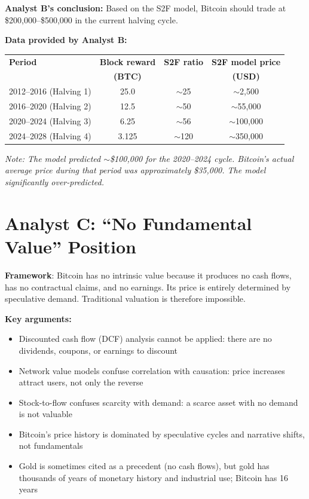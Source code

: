 \documentclass[11pt]{article}
\begin{document}
\medskip
\noindent\textbf{Analyst B's conclusion:} Based on the S2F model, Bitcoin should trade at \$200,000--\$500,000 in the current halving cycle.

\medskip
\noindent\textbf{Data provided by Analyst B:}

\begin{center}
\small
\begin{tabular}{lccc}
\toprule
\textbf{Period} & \textbf{Block reward} & \textbf{S2F ratio} & \textbf{S2F model price} \\
 & \textbf{(BTC)} & & \textbf{(USD)} \\
\midrule
2012--2016 (Halving 1) & 25.0 & $\sim$25 & $\sim$2,500 \\
2016--2020 (Halving 2) & 12.5 & $\sim$50 & $\sim$55,000 \\
2020--2024 (Halving 3) & 6.25 & $\sim$56 & $\sim$100,000 \\
2024--2028 (Halving 4) & 3.125 & $\sim$120 & $\sim$350,000 \\
\bottomrule
\end{tabular}
\end{center}

\smallskip
\noindent\textit{Note: The model predicted $\sim$\$100,000 for the 2020--2024 cycle. Bitcoin's actual average price during that period was approximately \$35,000. The model significantly over-predicted.}

\section*{Analyst C: ``No Fundamental Value'' Position}

\textbf{Framework}: Bitcoin has no intrinsic value because it produces no cash flows, has no contractual claims, and no earnings. Its price is entirely determined by speculative demand. Traditional valuation is therefore impossible.

\medskip
\noindent\textbf{Key arguments:}
\begin{itemize}[leftmargin=*]
\item Discounted cash flow (DCF) analysis cannot be applied: there are no dividends, coupons, or earnings to discount
\item Network value models confuse correlation with causation: price increases attract users, not only the reverse
\item Stock-to-flow confuses scarcity with demand: a scarce asset with no demand is not valuable
\item Bitcoin's price history is dominated by speculative cycles and narrative shifts, not fundamentals
\item Gold is sometimes cited as a precedent (no cash flows), but gold has thousands of years of monetary history and industrial use; Bitcoin has 16 years
\end{itemize}
\end{document}

